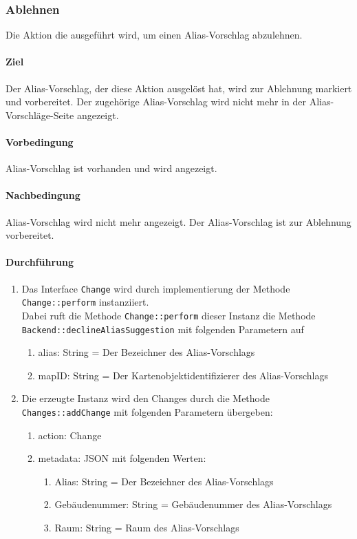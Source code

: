 \subsubsection{Ablehnen}

Die Aktion die ausgeführt wird, um einen Alias-Vorschlag abzulehnen.

\paragraph*{Ziel}
Der Alias-Vorschlag, der diese Aktion ausgelöst hat, wird zur Ablehnung markiert und vorbereitet.
Der zugehörige Alias-Vorschlag wird nicht mehr in der Alias-Vorschläge-Seite angezeigt.

\paragraph*{Vorbedingung}
Alias-Vorschlag ist vorhanden und wird angezeigt.

\paragraph*{Nachbedingung}
Alias-Vorschlag wird nicht mehr angezeigt. Der Alias-Vorschlag ist zur Ablehnung vorbereitet.

\paragraph*{Durchführung}
\begin{enumerate}
    \item Das Interface \verb#Change# wird durch implementierung der Methode \verb#Change::perform# instanziiert. \\
          Dabei ruft die Methode \verb#Change::perform# dieser Instanz die Methode \verb#Backend::declineAliasSuggestion# mit folgenden Parametern auf \begin{enumerate}
              \item alias: String = Der Bezeichner des Alias-Vorschlags
              \item mapID: String = Der Kartenobjektidentifizierer des Alias-Vorschlags
          \end{enumerate}
    \item Die erzeugte Instanz wird den Changes durch die Methode \verb#Changes::addChange# mit folgenden Parametern übergeben: \begin{enumerate}
        \item action: Change
        \item metadata: JSON mit folgenden Werten: \begin{enumerate}
            \item Alias: String = Der Bezeichner des Alias-Vorschlags
            \item Gebäudenummer: String = Gebäudenummer des Alias-Vorschlags
            \item Raum: String = Raum des Alias-Vorschlags
        \end{enumerate}
    \end{enumerate}
\end{enumerate}